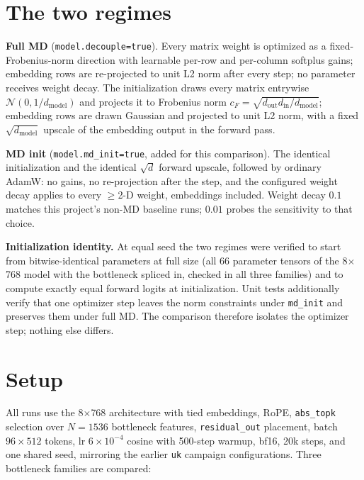 \documentclass[11pt,a4paper]{article}
\newcommand{\code}[1]{\texttt{#1}}
\begin{document}
\section{The two regimes}

\textbf{Full MD} (\code{model.decouple=true}). Every matrix weight is
optimized as a fixed-Frobenius-norm direction with learnable per-row and
per-column softplus gains; embedding rows are re-projected to unit L2 norm
after every step; no parameter receives weight decay. The initialization
draws every matrix entrywise $\mathcal N(0,1/d_{\mathrm{model}})$ and
projects it to Frobenius norm
$c_F=\sqrt{d_{\mathrm{out}}d_{\mathrm{in}}/d_{\mathrm{model}}}$; embedding
rows are drawn Gaussian and projected to unit L2 norm, with a fixed
$\sqrt{d_{\mathrm{model}}}$ upscale of the embedding output in the forward
pass.

\textbf{MD init} (\code{model.md\_init=true}, added for this comparison).
The identical initialization and the identical $\sqrt{d}$ forward upscale,
followed by ordinary AdamW: no gains, no re-projection after the step, and
the configured weight decay applies to every $\geq$2-D weight, embeddings
included. Weight decay $0.1$ matches this project's non-MD baseline runs;
$0.01$ probes the sensitivity to that choice.

\textbf{Initialization identity.} At equal seed the two regimes were
verified to start from bitwise-identical parameters at full size (all 66
parameter tensors of the 8$\times$768 model with the bottleneck spliced in,
checked in all three families) and to compute exactly equal forward logits
at initialization. Unit tests additionally verify that one optimizer step
leaves the norm constraints under \code{md\_init} and preserves them under
full MD. The comparison therefore isolates the optimizer step; nothing else
differs.

\section{Setup}

All runs use the 8$\times$768 architecture with tied embeddings, RoPE,
\code{abs\_topk} selection over $N=1536$ bottleneck features,
\code{residual\_out} placement, batch $96\times512$ tokens, lr $6\times
10^{-4}$ cosine with 500-step warmup, bf16, 20k steps, and one shared seed,
mirroring the earlier \code{uk} campaign configurations. Three bottleneck
families are compared:
\end{document}
